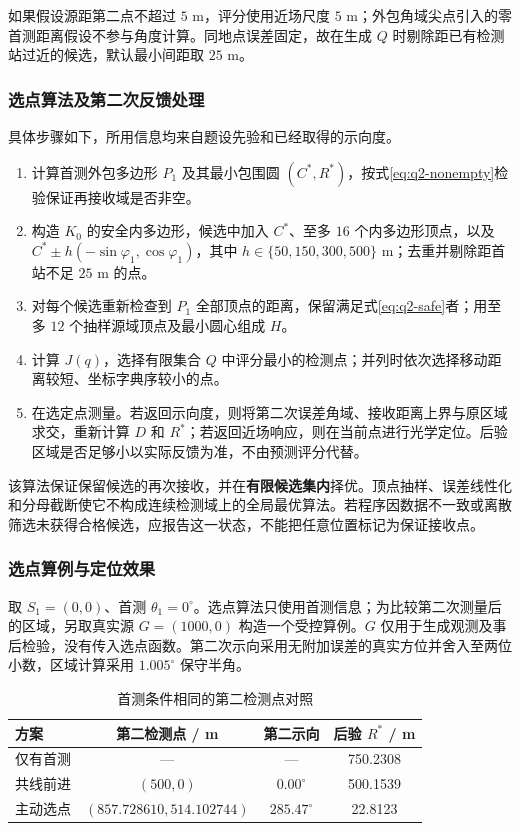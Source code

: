 如果假设源距第二点不超过 $5$ m，评分使用近场尺度 $5$ m；外包角域尖点引入的零首测距离假设不参与角度计算。同地点误差固定，故在生成 $Q$ 时剔除距已有检测站过近的候选，默认最小间距取 $25$ m。

\subsubsection{选点算法及第二次反馈处理}

具体步骤如下，所用信息均来自题设先验和已经取得的示向度。
\begin{enumerate}
\item 计算首测外包多边形 $P_1$ 及其最小包围圆 $(C^*,R^*)$，按式\eqref{eq:q2-nonempty}检验保证再接收域是否非空。
\item 构造 $K_0$ 的安全内多边形，候选中加入 $C^*$、至多 $16$ 个内多边形顶点，以及 $C^*\pm h(-\sin\varphi_1,\cos\varphi_1)$，其中 $h\in\{50,150,300,500\}$ m；去重并剔除距首站不足 $25$ m 的点。
\item 对每个候选重新检查到 $P_1$ 全部顶点的距离，保留满足式\eqref{eq:q2-safe}者；用至多 $12$ 个抽样源域顶点及最小圆心组成 $H$。
\item 计算 $J(q)$，选择有限集合 $Q$ 中评分最小的检测点；并列时依次选择移动距离较短、坐标字典序较小的点。
\item 在选定点测量。若返回示向度，则将第二次误差角域、接收距离上界与原区域求交，重新计算 $D$ 和 $R^*$；若返回近场响应，则在当前点进行光学定位。后验区域是否足够小以实际反馈为准，不由预测评分代替。
\end{enumerate}
该算法保证保留候选的再次接收，并在\textbf{有限候选集内}择优。顶点抽样、误差线性化和分母截断使它不构成连续检测域上的全局最优算法。若程序因数据不一致或离散筛选未获得合格候选，应报告这一状态，不能把任意位置标记为保证接收点。

\subsubsection{选点算例与定位效果}

取 $S_1=(0,0)$、首测 $\theta_1=0^\circ$。选点算法只使用首测信息；为比较第二次测量后的区域，另取真实源 $G=(1000,0)$ 构造一个受控算例。$G$ 仅用于生成观测及事后检验，没有传入选点函数。第二次示向采用无附加误差的真实方位并舍入至两位小数，区域计算采用 $1.005^\circ$ 保守半角。

\begin{table}[htbp]
\centering
\caption{首测条件相同的第二检测点对照}\label{tab:q2-example}
\small
\begin{tabular}{lccc}
\toprule
方案 & 第二检测点 / m & 第二示向 & 后验 $R^*$ / m \\
\midrule
仅有首测 & --- & --- & 750.2308 \\
共线前进 & $(500,0)$ & $0.00^\circ$ & 500.1539 \\
主动选点 & $(857.728610,514.102744)$ & $285.47^\circ$ & 22.8123 \\
\bottomrule
\end{tabular}
\end{table}


